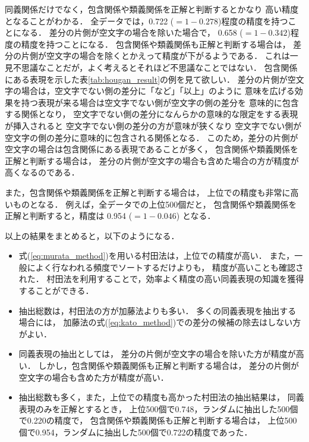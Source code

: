 同義関係だけでなく，包含関係や類義関係を正解と判断するとかなり
高い精度となることがわかる．
全データでは，0.722 ($= 1 - 0.278$)程度の精度を持つことになる．
差分の片側が空文字の場合を除いた場合で，
0.658 ($= 1 - 0.342$)程度の精度を持つことになる．
包含関係や類義関係も正解と判断する場合は，
差分の片側が空文字の場合を除くとかえって精度が下がるようである．
これは一見不思議なことだが，よく考えるとそれほど不思議なことではない．
包含関係にある表現を示した表\ref{tab:hougan_result}の例を見て欲しい．
差分の片側が空文字の場合は，空文字でない側の差分に「など」「以上」のように
意味を広げる効果を持つ表現が来る場合は空文字でない側が空文字の側の差分を
意味的に包含する関係となり，
空文字でない側の差分になんらかの意味的な限定をする表現が挿入されると
空文字でない側の差分の方が意味が狭くなり
空文字でない側が空文字の側の差分に意味的に包含される関係となる．
このため，差分の片側が空文字の場合は包含関係にある表現であることが多く，
包含関係や類義関係を正解と判断する場合は，
差分の片側が空文字の場合も含めた場合の方が精度が高くなるのである．

また，包含関係や類義関係を正解と判断する場合は，
上位での精度も非常に高いものとなる．
例えば，全データでの上位500個だと，
包含関係や類義関係を正解と判断すると，精度は
0.954 ($= 1 - 0.046$) となる．

以上の結果をまとめると，以下のようになる．
\begin{itemize}
\item 
  式(\ref{eq:murata_method})を用いる村田法は，上位での精度が高い．
  また，一般によく行なわれる頻度でソートするだけよりも，
  精度が高いことも確認された．
  村田法を利用することで，効率よく精度の高い同義表現の知識を獲得することができる．

\item 
  抽出総数は，村田法の方が加藤法よりも多い．
  多くの同義表現を抽出する場合には，
  加藤法の式(\ref{eq:kato_method})での差分の候補の除去はしない方がよい．

\item 
  同義表現の抽出としては，
  差分の片側が空文字の場合を除いた方が精度が高い．
  しかし，包含関係や類義関係も正解と判断する場合は，
  差分の片側が空文字の場合も含めた方が精度が高い．

\item 
  抽出総数も多く，また，上位での精度も高かった村田法の抽出結果は，
  同義表現のみを正解とするとき，
  上位500個で0.748，ランダムに抽出した500個で0.220の精度で，
  包含関係や類義関係も正解と判断する場合は，
  上位500個で0.954，ランダムに抽出した500個で0.722の精度であった．

\end{itemize}

